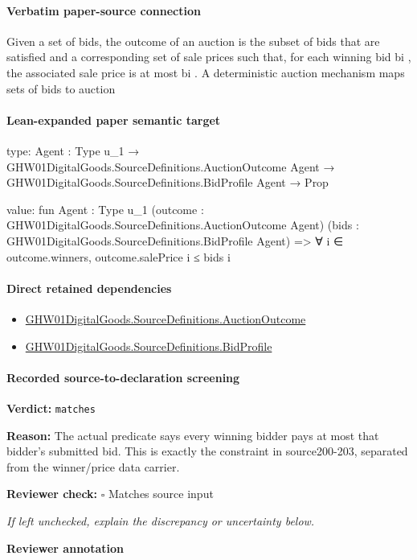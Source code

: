 \documentclass[10pt]{article}
\newcommand{\reviewerbox}{%
  \par\noindent\fbox{\parbox{0.96\linewidth}{\rule{0pt}{0.38in}}}\par
}
\newcommand{\reviewmatch}[1]{%
  \par\noindent\textbf{Reviewer check:} $\square$\; #1\par
  \noindent\emph{If left unchecked, explain the discrepancy or uncertainty below.}\par
}
\begin{document}
\paragraph{Verbatim paper-source connection}
\begin{ReviewVerbatim}
Given a set of bids, the outcome of an auction is the
subset of bids that are satisfied and a corresponding
set of sale prices such that, for each winning bid bi ,
the associated sale price is at most bi . A deterministic auction mechanism maps sets of bids to auction
\end{ReviewVerbatim}



\paragraph{Lean-expanded paper semantic target}
\begin{ReviewVerbatim}
type:
{Agent : Type u_1} →
  GHW01DigitalGoods.SourceDefinitions.AuctionOutcome Agent → GHW01DigitalGoods.SourceDefinitions.BidProfile Agent → Prop

value:
fun {Agent : Type u_1} (outcome : GHW01DigitalGoods.SourceDefinitions.AuctionOutcome Agent)
    (bids : GHW01DigitalGoods.SourceDefinitions.BidProfile Agent) =>
  ∀ i ∈ outcome.winners, outcome.salePrice i ≤ bids i
\end{ReviewVerbatim}

\paragraph{Direct retained dependencies}
\begin{itemize}\raggedright
\item \hyperlink{paper-prerequisite-fc173e8d557afd08}{GHW01\allowbreak{}Digital\allowbreak{}Goods.\allowbreak{}Source\allowbreak{}Definitions.\allowbreak{}Auction\allowbreak{}Outcome}
\item \hyperlink{paper-prerequisite-ac8769d0dccf04f4}{GHW01\allowbreak{}Digital\allowbreak{}Goods.\allowbreak{}Source\allowbreak{}Definitions.\allowbreak{}Bid\allowbreak{}Profile}
\end{itemize}
\paragraph{Recorded source-to-declaration screening}
\textbf{Verdict:} \texttt{matches}
\\
{\raggedright
\textbf{Reason:} The actual predicate says every winning bidder pays at most that bidder's submitted bid.\allowbreak{} This is exactly the constraint in source200-\allowbreak{}203, separated from the winner/\allowbreak{}price data carrier.\allowbreak{}
\par}
\reviewmatch{Matches source input}
\noindent\textbf{Reviewer annotation}\par
\reviewerbox
\clearpage
\hypertarget{paper-prerequisite-6b7e7981d9081e03}{}
\end{document}
